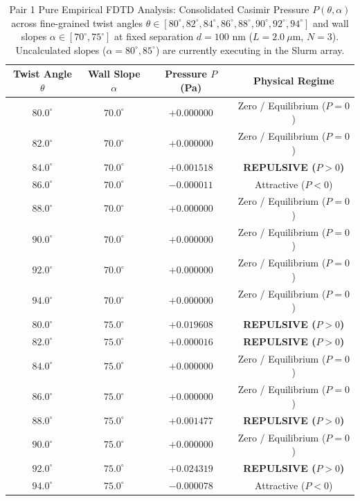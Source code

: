 \documentclass[12pt,letterpaper]{article}
\begin{document}
\begin{table}[h!]
\centering
\caption{Pair 1 Pure Empirical FDTD Analysis: Consolidated Casimir Pressure $P(\theta, \alpha)$ across fine-grained twist angles $\theta \in [80^\circ, 82^\circ, 84^\circ, 86^\circ, 88^\circ, 90^\circ, 92^\circ, 94^\circ]$ and wall slopes $\alpha \in [70^\circ, 75^\circ]$ at fixed separation $d = 100$ nm ($L=2.0\ \mu\text{m}$, $N=3$). Uncalculated slopes ($\alpha = 80^\circ, 85^\circ$) are currently executing in the Slurm array.}
\begin{tabular}{cccc}
\hline
\textbf{Twist Angle $\theta$} & \textbf{Wall Slope $\alpha$} & \textbf{Pressure $P$ (Pa)} & \textbf{Physical Regime} \\
\hline
$80.0^\circ$ & $70.0^\circ$ & $+0.000000$ & Zero / Equilibrium ($P=0$) \\
$82.0^\circ$ & $70.0^\circ$ & $+0.000000$ & Zero / Equilibrium ($P=0$) \\
$84.0^\circ$ & $70.0^\circ$ & $+0.001518$ & \textbf{REPULSIVE ($P>0$)} \\
$86.0^\circ$ & $70.0^\circ$ & $-0.000011$ & Attractive ($P<0$) \\
$88.0^\circ$ & $70.0^\circ$ & $+0.000000$ & Zero / Equilibrium ($P=0$) \\
$90.0^\circ$ & $70.0^\circ$ & $+0.000000$ & Zero / Equilibrium ($P=0$) \\
$92.0^\circ$ & $70.0^\circ$ & $+0.000000$ & Zero / Equilibrium ($P=0$) \\
$94.0^\circ$ & $70.0^\circ$ & $+0.000000$ & Zero / Equilibrium ($P=0$) \\
$80.0^\circ$ & $75.0^\circ$ & $+0.019608$ & \textbf{REPULSIVE ($P>0$)} \\
$82.0^\circ$ & $75.0^\circ$ & $+0.000016$ & \textbf{REPULSIVE ($P>0$)} \\
$84.0^\circ$ & $75.0^\circ$ & $+0.000000$ & Zero / Equilibrium ($P=0$) \\
$86.0^\circ$ & $75.0^\circ$ & $+0.000000$ & Zero / Equilibrium ($P=0$) \\
$88.0^\circ$ & $75.0^\circ$ & $+0.001477$ & \textbf{REPULSIVE ($P>0$)} \\
$90.0^\circ$ & $75.0^\circ$ & $+0.000000$ & Zero / Equilibrium ($P=0$) \\
$92.0^\circ$ & $75.0^\circ$ & $+0.024319$ & \textbf{REPULSIVE ($P>0$)} \\
$94.0^\circ$ & $75.0^\circ$ & $-0.000078$ & Attractive ($P<0$) \\
\hline
\end{tabular}
\end{table}
\end{document}
